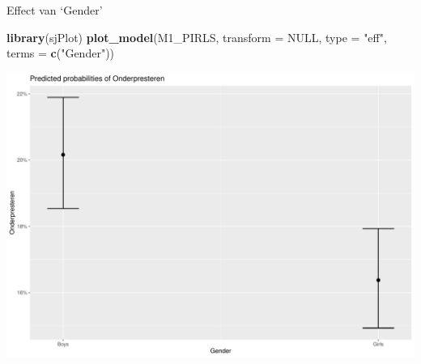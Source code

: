 \documentclass[
  10pt,
  ignorenonframetext,
]{beamer}
\newenvironment{Shaded}{\begin{snugshade}}{\end{snugshade}}
\newcommand{\DataTypeTok}[1]{\textcolor[rgb]{0.13,0.29,0.53}{#1}}
\newcommand{\KeywordTok}[1]{\textcolor[rgb]{0.13,0.29,0.53}{\textbf{#1}}}
\newcommand{\NormalTok}[1]{#1}
\newcommand{\OtherTok}[1]{\textcolor[rgb]{0.56,0.35,0.01}{#1}}
\newcommand{\StringTok}[1]{\textcolor[rgb]{0.31,0.60,0.02}{#1}}
\begin{document}
\begin{frame}[fragile]{Effect van `Gender'}
\protect\hypertarget{effect-van-gender}{}

\tiny

\begin{Shaded}
\begin{Highlighting}[]
\KeywordTok{library}\NormalTok{(sjPlot)}
\KeywordTok{plot_model}\NormalTok{(M1_PIRLS, }\DataTypeTok{transform =} \OtherTok{NULL}\NormalTok{, }\DataTypeTok{type =} \StringTok{"eff"}\NormalTok{, }\DataTypeTok{terms =} \KeywordTok{c}\NormalTok{(}\StringTok{"Gender"}\NormalTok{))}
\end{Highlighting}
\end{Shaded}

\includegraphics[height=0.7\textheight]{C6_files/figure-beamer/unnamed-chunk-4-1}

\normalsize

\end{frame}
\end{document}
